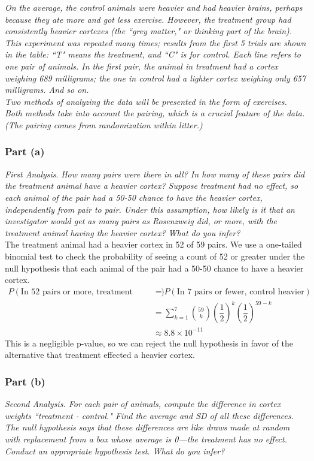 \documentclass[11pt]{article}
\begin{document}
\noindent \emph{On the average, the control animals were heavier and had heavier brains, perhaps because they ate more and got less exercise. However, the treatment group had consistently heavier cortexes (the ``grey matter," or thinking part of the brain). This experiment was repeated many times; results from the first 5 trials are shown in the table: ``T" means the treatment, and ``C" is for control. Each line refers to one pair of animals. In the first pair, the animal in treatment had a cortex weighing 689 milligrams; the one in control had a lighter cortex weighing only 657 milligrams. And so on.}\\

\noindent \emph{Two methods of analyzing the data will be presented in the form of exercises. Both methods take into account the pairing, which is a crucial feature of the data. (The pairing comes from randomization within litter.)}

\subsubsection*{Part (a)}
\textit{First Analysis}.
\textit{ How many pairs were there in all?
In how many of these pairs did the treatment animal have a heavier cortex?
Suppose treatment had no effect, so each animal of the pair had a 50-50 chance to have the heavier cortex, independently from pair to pair.
Under this assumption, how likely is it that an investigator would get as many pairs as Rosenzweig did, or more, with the treatment animal having the heavier cortex?
What do you infer?}\\

The treatment animal had a heavier cortex in 52 of 59 pairs.  We use a one-tailed binomial test to check the probability of seeing a count of 52 or greater under the null hypothesis that each animal of the pair had a 50-50 chance to have a heavier cortex.
\begin{align*}
P(\text{In 52 pairs or more, treatment heavier}) &= P(\text{In 7 pairs or fewer, control heavier})\\
&= \sum_{k=1}^{7} \binom{59}{k}(\dfrac{1}{2})^{k}(\dfrac{1}{2})^{59-k} \\
&\approx 8.8 \times 10^{-11}
\end{align*}
This is a negligible p-value, so we can reject the null hypothesis in favor of the alternative that treatment effected a heavier cortex.

\subsubsection*{Part (b)}
\textit{Second Analysis.
For each pair of animals, compute the difference in cortex weights ``treatment - control."
Find the average and SD of all these differences.
The null hypothesis says that these differences are like draws made at random with replacement from a box whose average is 0---the treatment has no effect.
Conduct an appropriate hypothesis test.
What do you infer?}\\
\end{document}
